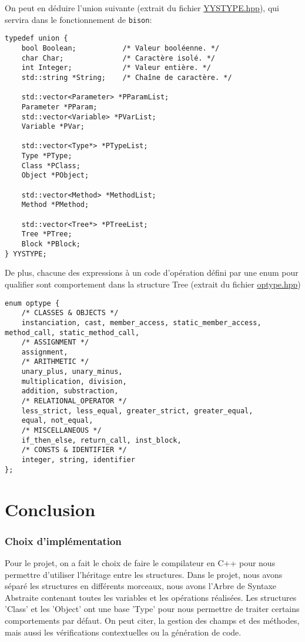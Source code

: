 \documentclass[12pt,a4paper]{article}
\begin{document}
On peut en déduire l'{\color{blue}union} suivante (extrait du fichier \href{../YYSTYPE.hpp}{\ttfamily YYSTYPE.hpp}), qui servira dans le fonctionnement de \texttt{bison}:
\begin{lstlisting}
typedef union {
	bool Boolean;			/* Valeur booléenne. */
	char Char;				/* Caractère isolé. */
	int Integer;			/* Valeur entière. */
	std::string *String;	/* Chaîne de caractère. */
	
	std::vector<Parameter> *PParamList;
	Parameter *PParam;
	std::vector<Variable> *PVarList;
	Variable *PVar;
	
	std::vector<Type*> *PTypeList;
	Type *PType;
	Class *PClass;
	Object *PObject;
	
	std::vector<Method> *MethodList;
	Method *PMethod;
	
	std::vector<Tree*> *PTreeList;
	Tree *PTree;
	Block *PBlock;
} YYSTYPE;
\end{lstlisting}

\newpage

De plus, chacune des expressions à un code d'opération défini par une {\color{blue}enum} pour qualifier sont comportement dans la structure Tree (extrait du fichier \href{../optype.hpp}{\ttfamily optype.hpp})
\begin{lstlisting}
enum optype {
	/* CLASSES & OBJECTS */
	instanciation, cast, member_access, static_member_access, method_call, static_method_call,
	/* ASSIGNMENT */
	assignment,
	/* ARITHMETIC */
	unary_plus, unary_minus,
	multiplication, division,
	addition, substraction,
	/* RELATIONAL_OPERATOR */
	less_strict, less_equal, greater_strict, greater_equal,
	equal, not_equal,
	/* MISCELLANEOUS */
	if_then_else, return_call, inst_block,
	/* CONSTS & IDENTIFIER */
	integer, string, identifier
};
\end{lstlisting}

\part{Conclusion}

\section{Choix d'implémentation}

Pour le projet, on a fait le choix de faire le compilateur en C++ pour nous permettre d’utiliser l’héritage entre les structures. Dans le projet, nous avons séparé les structures en différents morceaux, nous avons l’Arbre de Syntaxe Abstraite contenant toutes les variables et les opérations réalisées. Les structures 'Class' et les 'Object' ont une base 'Type' pour nous permettre de traiter certains comportements par défaut. On peut citer, la gestion des champs et des méthodes, mais aussi les vérifications contextuelles ou la génération de code.
\end{document}
